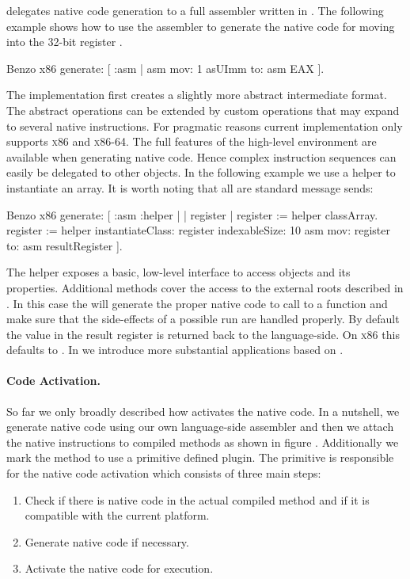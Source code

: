 \B delegates native code generation to a full assembler written in \PH. The following example shows how to use the assembler to generate the native code for moving  into the 32-bit register .
%
\begin{stcode}{4}
Benzo x86 generate: [ :asm |
	asm mov: 1 asUImm to: asm EAX ].
\end{stcode}
%
The implementation first creates a slightly more abstract intermediate format.
The abstract operations can be extended by custom operations that may expand to several native instructions. For pragmatic reasons current implementation only supports \textsc{x86} and \textsc{x86-64}.
The full features of the high-level environment are available when generating native code.
Hence complex instruction sequences can easily be delegated to other objects.
In the following example we use a \VM helper to instantiate an array. It is worth noting that all are standard message sends:
%
\begin{stcode}{5}
Benzo x86 generate: [ :asm :helper | | register |
	register := helper classArray.
	register := helper 
		instantiateClass: register
		indexableSize: 10
	asm mov: register to: asm resultRegister ].
\end{stcode}
%
The \VM helper exposes a basic, low-level interface to access objects and its properties.
Additional methods cover the access to the external roots described in .
In this case the  will generate the proper native code to call to a \VM function and make sure that the side-effects of a possible \GC run are handled properly.
By default the value in the result register is returned back to the language-side. On \textsc{x86} this defaults to .
In  we introduce more substantial applications based on \B.

\paragraph{Code Activation.}
 
So far we only broadly described how \B activates the native code.
In a nutshell, we generate native code using our own language-side assembler and then we attach the native instructions to compiled methods as shown in figure .
Additionally we mark the method to use a primitive defined \B plugin.
The \B primitive is responsible for the native code activation which consists of three main steps:
%
\begin{enumerate}[noitemsep]
	\item Check if there is native code in the actual compiled method and if it is compatible with the current platform.
	\item Generate native code if necessary.
	\item Activate the native code for execution.
\end{enumerate}

